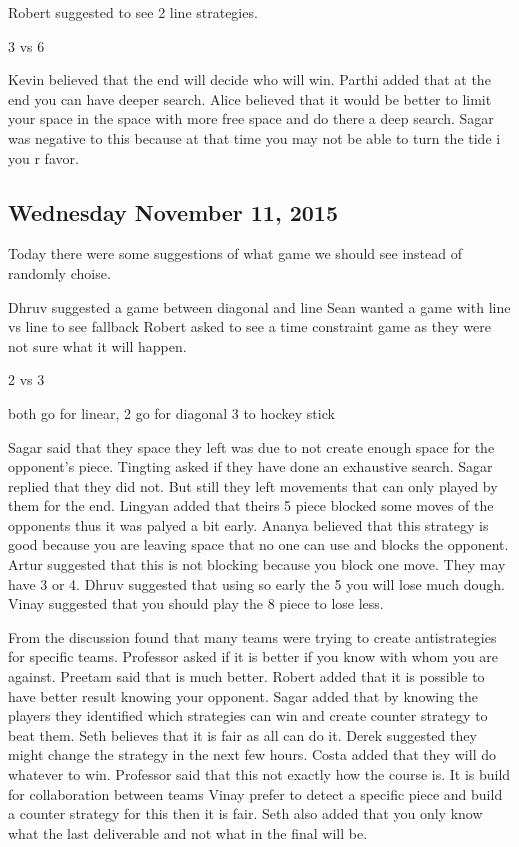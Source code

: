 Robert suggested to see 2 line strategies.

3 vs 6

Kevin believed that the end will decide who will win.
Parthi added that at the end you can have deeper search.
Alice believed that it would be better to limit your space in the space with more free space and do there a deep search.
Sagar was negative to this because at that time you may not be able to turn the tide i you r favor.

\subsection{Wednesday November 11, 2015}
Today there were some suggestions of what game we should see instead of randomly choise.

Dhruv suggested a game between diagonal and line
Sean wanted a game with line vs line to see fallback
Robert asked to see a  time constraint game as they were not sure what it will happen.


2 vs 3 

both go for linear, 2 go for diagonal 3 to hockey stick

Sagar said that they space they left was due to not create enough space for the opponent’s piece.
Tingting asked if they have done an exhaustive search.
Sagar replied that they did not. But still they left movements that can only played by them for the end.
Lingyan added that theirs 5 piece blocked some moves of the opponents thus it was palyed a bit early.
Ananya believed that this strategy is good because you are leaving space that no one can use and blocks the opponent.
Artur suggested that this is not blocking because you block one move. They may have 3 or 4.
Dhruv suggested that using so early the 5 you will lose much dough.
Vinay suggested that you should play the 8 piece to lose less.


From the discussion found that many teams were trying to create antistrategies for specific teams.
Professor asked if it is better if you know with whom you are against.
Preetam said that is much better.
Robert added that it is possible to have better result knowing your opponent.
Sagar added that by knowing the players they identified which strategies can win and create counter strategy to beat them.
Seth believes that it is fair as all can do it.
Derek suggested they might change the strategy in the next few hours.
Costa added that they will do whatever to win.
Professor said that this not exactly how the course is. It is build for collaboration between teams
Vinay prefer to detect a specific piece and build a counter strategy for this then it is fair.
Seth also added that you only know what the last deliverable and not what in the final will be.

